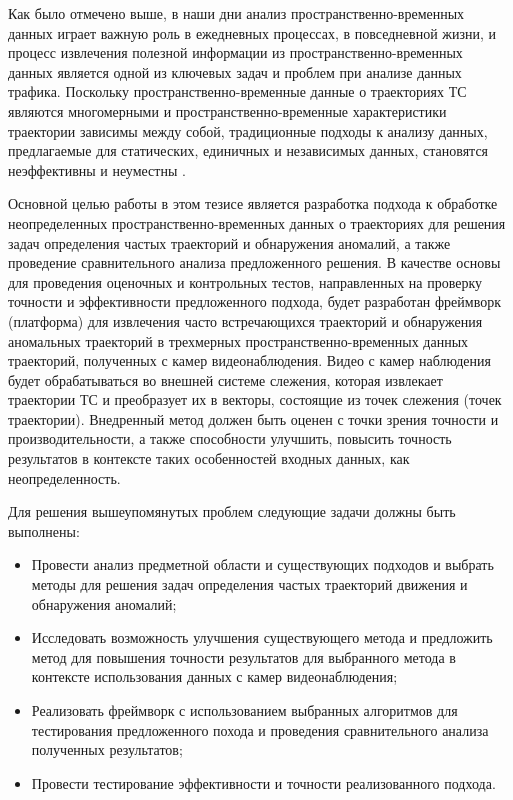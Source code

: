 Как было отмечено выше, в наши дни анализ пространственно-временных данных играет важную роль в ежедневных процессах, в повседневной жизни, и процесс извлечения полезной информации из пространственно-временных данных является одной из ключевых задач и проблем при анализе данных трафика. Поскольку пространственно-временные данные о траекториях ТС являются многомерными и пространственно-временные характеристики траектории зависимы между собой, традиционные подходы к анализу данных, предлагаемые для статических, единичных и независимых данных, становятся неэффективны и неуместны \cite{article:8_review_mot_cl_alg}. 

Основной целью работы в этом тезисе является разработка подхода к обработке неопределенных пространственно-временных данных о траекториях для решения задач определения частых траекторий и обнаружения аномалий, а также проведение сравнительного анализа предложенного решения. В качестве основы для проведения оценочных и контрольных тестов, направленных на проверку точности и эффективности предложенного подхода, будет разработан фреймворк (платформа) для извлечения часто встречающихся траекторий и обнаружения аномальных траекторий в трехмерных пространственно-временных данных траекторий, полученных с камер видеонаблюдения. Видео с камер наблюдения будет обрабатываться во внешней системе слежения, которая извлекает траектории ТС и преобразует их в векторы, состоящие из точек слежения (точек траектории). Внедренный метод должен быть оценен с точки зрения точности и производительности, а также способности улучшить, повысить точность результатов в контексте таких особенностей входных данных, как неопределенность.

Для решения вышеупомянутых проблем следующие задачи должны быть выполнены:

\begin{itemize}
	\setlength\itemsep{-0.5em}
	\item Провести анализ предметной области и существующих подходов и выбрать методы для решения задач определения частых траекторий движения и обнаружения аномалий;
	\item Исследовать возможность улучшения существующего метода и предложить метод для повышения точности результатов для выбранного метода в контексте использования данных с камер видеонаблюдения;
	\item Реализовать фреймворк с использованием выбранных алгоритмов для тестирования предложенного похода и проведения сравнительного анализа полученных результатов;
	\item Провести тестирование эффективности и точности реализованного подхода.
\end{itemize}

